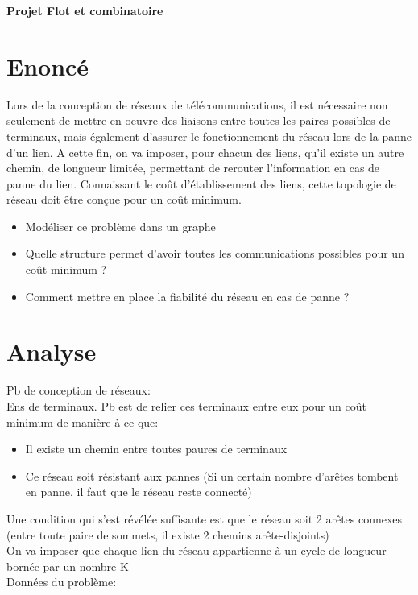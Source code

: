 \documentclass[frenchb]{article}
\begin{document}
		\begin{title}
			\textbf{\huge{Projet Flot et combinatoire}}
		\end{title}
		
		
		\section {	Enoncé}
			Lors de la conception de réseaux de télécommunications, il est nécessaire non seulement de mettre en oeuvre des liaisons entre toutes les paires possibles de terminaux, mais également d'assurer le fonctionnement du réseau lors de la panne d'un lien. A cette fin, on va imposer, pour chacun des liens, qu'il existe un autre chemin, de longueur limitée, permettant de rerouter l'information en cas de panne du lien. Connaissant le coût d'établissement des liens, cette topologie de réseau doit être conçue pour un coût minimum.
			\begin{itemize}
				\item{Modéliser ce problème dans un graphe}
				\item{Quelle structure permet d'avoir toutes les communications possibles pour un coût minimum ?}
				\item{Comment mettre en place la fiabilité du réseau en cas de panne ?}
			\end{itemize}
			
			
			\section{Analyse}
				Pb de conception de réseaux:\\
				Ens de terminaux. Pb est de relier ces terminaux entre eux pour un coût minimum de manière à ce que:
				\begin{itemize}
					\item{Il existe un chemin entre toutes paures de terminaux}
					\item{Ce réseau soit résistant aux pannes (Si un certain nombre d'arêtes tombent en panne, il faut que le réseau reste connecté)} 
				\end{itemize}
				
				Une condition qui s'est révélée suffisante est que le réseau soit 2 arêtes connexes (entre toute paire de sommets, il existe 2 chemins arête-disjoints)\\
				
				On va imposer que chaque lien du réseau appartienne à un cycle de longueur bornée par un nombre K\\
				Données du problème:\\
				
\end{document}
